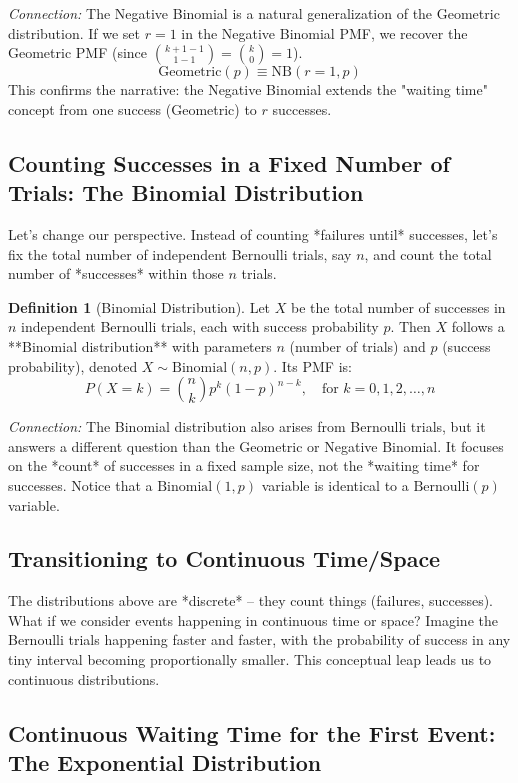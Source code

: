\documentclass[11pt, letterpaper]{article}
\theoremstyle{definition}
\newtheorem{definition}[theorem]{Definition}
\theoremstyle{remark}
\begin{document}
\textit{Connection:} The Negative Binomial is a natural generalization of the Geometric distribution. If we set $r=1$ in the Negative Binomial PMF, we recover the Geometric PMF (since $\binom{k+1-1}{1-1} = \binom{k}{0} = 1$).
$$ \text{Geometric}(p) \equiv \text{NB}(r=1, p) $$
This confirms the narrative: the Negative Binomial extends the "waiting time" concept from one success (Geometric) to $r$ successes.

\subsection{Counting Successes in a Fixed Number of Trials: The Binomial Distribution}

Let's change our perspective. Instead of counting *failures until* successes, let's fix the total number of independent Bernoulli trials, say $n$, and count the total number of *successes* within those $n$ trials.

\begin{definition}[Binomial Distribution]
Let $X$ be the total number of successes in $n$ independent Bernoulli trials, each with success probability $p$. Then $X$ follows a **Binomial distribution** with parameters $n$ (number of trials) and $p$ (success probability), denoted $X \sim \text{Binomial}(n, p)$. Its PMF is:
$$ P(X=k) = \binom{n}{k} p^k (1-p)^{n-k}, \quad \text{for } k = 0, 1, 2, \dots, n $$
\end{definition}

\textit{Connection:} The Binomial distribution also arises from Bernoulli trials, but it answers a different question than the Geometric or Negative Binomial. It focuses on the *count* of successes in a fixed sample size, not the *waiting time* for successes. Notice that a $\text{Binomial}(1, p)$ variable is identical to a $\text{Bernoulli}(p)$ variable.

\subsection{Transitioning to Continuous Time/Space}

The distributions above are *discrete* – they count things (failures, successes). What if we consider events happening in continuous time or space? Imagine the Bernoulli trials happening faster and faster, with the probability of success in any tiny interval becoming proportionally smaller. This conceptual leap leads us to continuous distributions.

\subsection{Continuous Waiting Time for the First Event: The Exponential Distribution}
\end{document}
